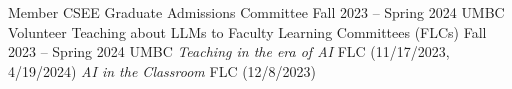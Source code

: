 {\color{black}\fontsize{12pt}{1em}} 

\begin{cventries}
\cventry
    {Member}
    {CSEE Graduate Admissions Committee}
    {Fall 2023 -- Spring 2024}
    {UMBC}
    {}    
\cventry
    {Volunteer}
    {Teaching about LLMs to Faculty Learning Committees (FLCs)}
    {Fall 2023 -- Spring 2024}
    {UMBC}
    {\textit{Teaching in the era of AI} FLC (11/17/2023, 4/19/2024)\newline
    \textit{AI in the Classroom} FLC (12/8/2023)}   
\end{cventries}



